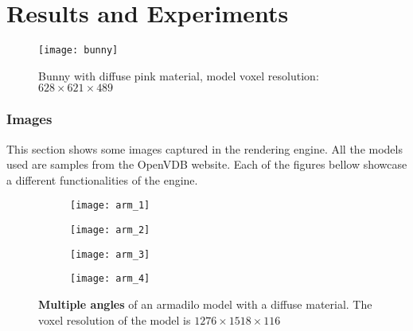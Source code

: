 
\part{Results and Experiments}\label{results}

\begin{figure}[H]
  \centering
  \texttt{[image: bunny]}
  \caption{Bunny with diffuse pink material, model voxel resolution: $628\times621\times489$}
\end{figure}

\section{Images}

This section shows some images captured in the rendering engine. All the models used are samples from the OpenVDB website\supercite{openvdb:models}. Each of the figures bellow showcase a different functionalities of the engine.

\begin{figure}[H]
  \centering
  \begin{subfigure}[b]{0.48\textwidth}
    \texttt{[image: arm\_1]}
  \end{subfigure}
  \hfill
  \begin{subfigure}[b]{0.48\textwidth}
    \texttt{[image: arm\_2]}
  \end{subfigure}
  \begin{subfigure}[b]{0.48\textwidth}
    \texttt{[image: arm\_3]}
  \end{subfigure}
  \hfill
  \begin{subfigure}[b]{0.48\textwidth}
    \texttt{[image: arm\_4]}
  \end{subfigure}
  \caption{\textbf{Multiple angles} of an armadilo model with a diffuse material. The voxel resolution of the model is $1276\times1518\times116$}
\end{figure}

